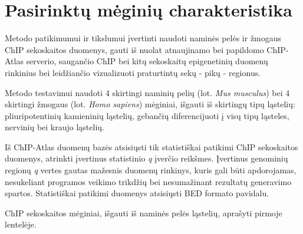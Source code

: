 \documentclass[12pt]{article}
\begin{document}
\newpage


\section{Pasirinktų mėginių charakteristika}
Metodo patikimumui ir tikslumui įvertinti naudoti naminės pelės ir žmogaus
ChIP se\-kos\-kai\-tos duomenys, gauti iš nuolat atnaujinamo bei papildomo
ChIP-Atlas\cite{CHIPATLAS} serverio, saugančio ChIP bei kitų sekoskaitų
epigenetinių duomenų rinkinius bei leidžiančio vizualizuoti praturtintų sekų -
pikų - regionus\cite{CHIPATLAS2}.

Metodo testavimui naudoti 4 skirtingi naminių pelių (lot. \emph{Mus musculus})
bei 4 skirtingi žmogaus (lot. \emph{Homo sapiens}) mėginiai, išgauti iš
skirtingų tipų ląstelių: pliuripotentinių kamieninių ląstelių, gebančių
diferencijuoti į visų tipų ląsteles, nervinių bei kraujo ląstelių.

Iš ChIP-Atlas duomenų bazės atsisiųsti tik statistiškai patikimi ChIP
sekoskaitos duomenys, atrinkti įvertinus statistinio \emph{q} įverčio reikšmes.
Įvertinus genominių regionų \emph{q} vertes gautas mažesnis duomenų rinkinys,
kuris gali būti apdorojamas, nesukeliant programos veikimo trikdžių bei
nesumažinant rezultatų generavimo spartos. Statistiškai patikimi duomenys
atsisiųsti BED formato pavidalu.

ChIP sekoskaitos mėginiai, išgauti iš naminės pelės ląstelių, aprašyti pirmoje
lentelėje.
\end{document}
